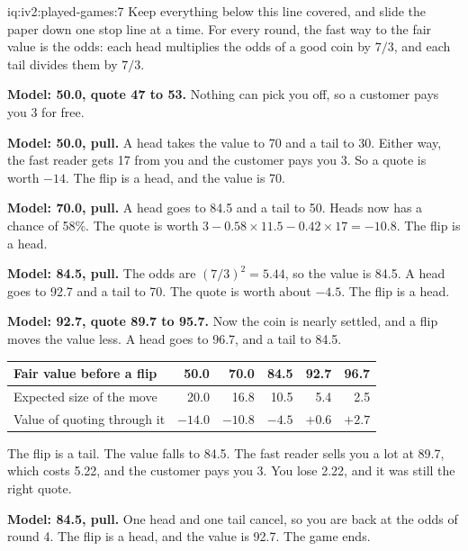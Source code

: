 \begin{solution}{iq:iv2:played-games:7}
Keep everything below this line covered, and slide the paper down one stop line at a time. For every round, the fast way to the fair value is the odds: each head multiplies the odds of a good coin by $7/3$, and each tail divides them by $7/3$.

\ivstop
\textbf{Model: 50.0, quote 47 to 53.} Nothing can pick you off, so a customer pays you 3 for free.

\ivstop
\textbf{Model: 50.0, pull.} A head takes the value to 70 and a tail to 30. Either way, the fast reader gets 17 from you and the customer pays you 3. So a quote is worth $-14$. The flip is a head, and the value is 70.

\ivstop
\textbf{Model: 70.0, pull.} A head goes to 84.5 and a tail to 50. Heads now has a chance of 58\%. The quote is worth $3 - 0.58 \times 11.5 - 0.42 \times 17 = -10.8$. The flip is a head.

\ivstop
\textbf{Model: 84.5, pull.} The odds are $(7/3)^2 = 5.44$, so the value is 84.5. A head goes to 92.7 and a tail to 70. The quote is worth about $-4.5$. The flip is a head.

\ivstop
\textbf{Model: 92.7, quote 89.7 to 95.7.} Now the coin is nearly settled, and a flip moves the value less. A head goes to 96.7, and a tail to 84.5.
\begin{center}\small
\begin{tabular}{@{}l*{5}{r}@{}}
Fair value before a flip & 50.0 & 70.0 & 84.5 & 92.7 & 96.7 \\ \hline
Expected size of the move & 20.0 & 16.8 & 10.5 & 5.4 & 2.5 \\
Value of quoting through it & $-14.0$ & $-10.8$ & $-4.5$ & $+0.6$ & $+2.7$
\end{tabular}
\end{center}
The flip is a tail. The value falls to 84.5. The fast reader sells you a lot at 89.7, which costs 5.22, and the customer pays you 3. You lose 2.22, and it was still the right quote.

\ivstop
\textbf{Model: 84.5, pull.} One head and one tail cancel, so you are back at the odds of round 4. The flip is a head, and the value is 92.7. The game ends.


\end{solution}

